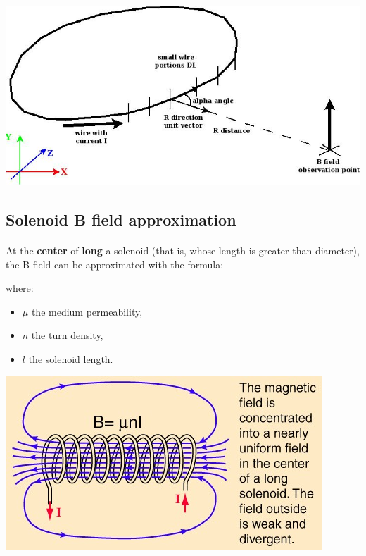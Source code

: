 \documentclass[12pt]{article}
\begin{document}
\begin{center}
  \includegraphics[keepaspectratio=true, width=1.\textwidth]{../dia/bfield_integration/main.jpg}
\end{center}

\subsection{Solenoid B field approximation}
\paragraph{} At the \textbf{center} of \textbf{long} a solenoid (that is, whose length is greater than
diameter), the B field can be approximated with the formula:
\begin{center}
\end{center}
where:
\begin{itemize}
  \item $\mu$ the medium permeability,
  \item $n$ the turn density,
  \item $l$ the solenoid length.
\end{itemize}

\begin{center}
  \includegraphics[keepaspectratio=true, width=1.\textwidth]{../pics/solenoid_bfield_approx.jpg}
\end{center}
\end{document}
